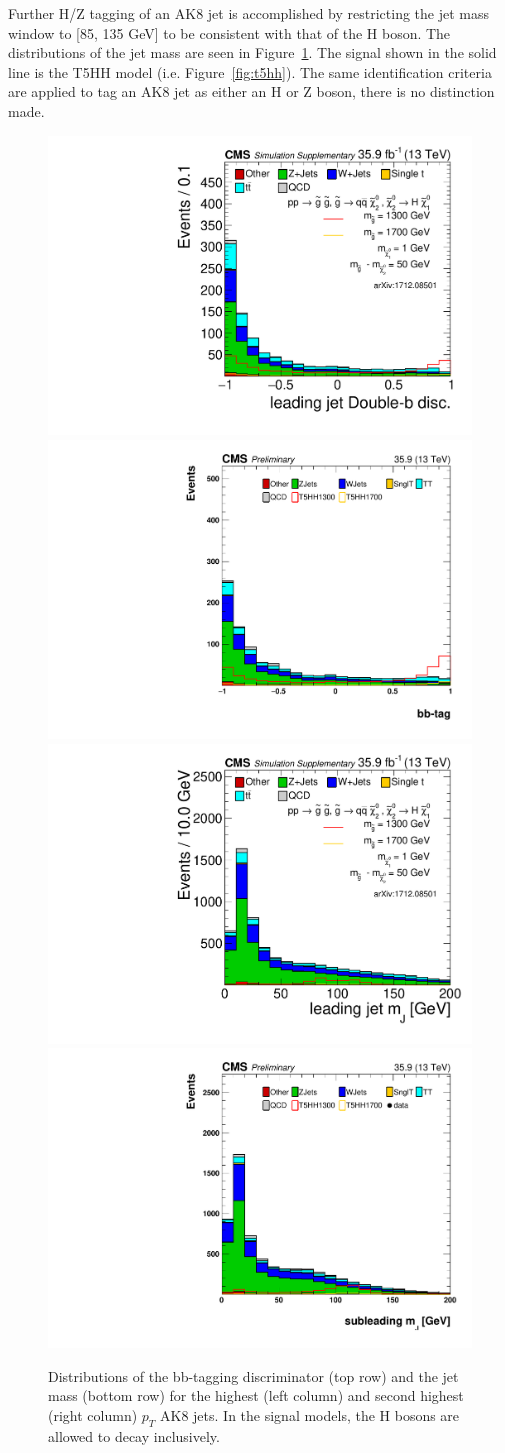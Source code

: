 Further H/Z tagging of an AK8 jet is accomplished by restricting the jet mass window to [85, 135 GeV] to be consistent with that of the H boson. The distributions of the jet mass are seen in Figure~\ref{fig:ak8dists}. The signal shown in the solid line is the T5HH model (i.e. Figure~\ref{fig:t5hh}). The same identification criteria are applied to tag an AK8 jet as either an H or Z boson, there is no distinction made.

\begin{figure}[hbp!]
\centering
\includegraphics[width=0.425\linewidth]{figs/J1BB_LooseJetMass.pdf}
\includegraphics[width=0.425\linewidth]{figs/J2pt_BBtag_baseline.pdf}\\
\includegraphics[width=0.425\linewidth]{figs/J1Mwide_JetPt.pdf}
\includegraphics[width=0.425\linewidth]{figs/J2Mwide_JetPt.pdf}\\
\caption[Distributions of the bb-tagging discriminator and jet mass for AK8 jets.]
{Distributions of the bb-tagging discriminator (top row) and the jet mass (bottom row) for the highest (left column) and second highest (right column) $p_{T}$ AK8 jets. In the signal models, the H bosons are allowed to decay inclusively.}
\label{fig:ak8dists}
\end{figure}

